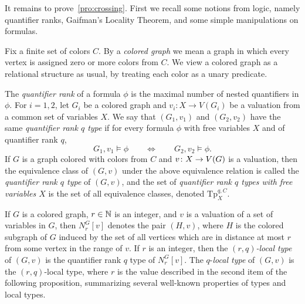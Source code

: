 It remains to prove~\cref{pro:crossing}. 
First we recall some notions from logic, namely quantifier ranks, Gaifman's Locality Theorem, and some simple manipulations on formulas.

 Fix a finite set of  colors $C$.
By a \emph{colored graph} we mean a graph  in which 
every vertex is assigned zero or more colors from $C$. We view a colored graph as a relational structure as usual, by treating each color as a unary predicate. 

The \emph{quantifier rank} of a formula $\phi$ is the maximal number of nested quantifiers in $\phi$.
For $i=1,2$, let $G_i$
be a colored graph and $v_i:X\to V(G_i)$ be a valuation
from a common set of variables $X$.
We say that $(G_1, v_1)$ and $(G_2,v_2)$
have the same \emph{quantifier rank $q$ type} %
if for every formula $\phi$ with  free variables $X$ and of quantifier rank $q$,
 $$G_1,v_1\models \phi\qquad\iff \qquad G_2,v_2\models \phi.$$
If $G$ is a graph colored with colors from $C$ and 
 $v\colon X\to V(G)$ is a valuation, 
then the equivalence class of $(G, v)$ under the above equivalence relation is called the \emph{quantifier rank $q$ type} of $(G,v)$, and  the set of \emph{quantifier rank $q$ types with  free variables $X$}
is the set of all equivalence classes, denoted
$\mathrm{Tp}^{q,C}_X$.

 If $G$ is a colored graph, $r\in\mathbb{N}$ is an integer, and $v$ is a valuation of a set of variables in $G$, then  $N^G_r[v]$ denotes the pair $(H,v)$, where $H$ is the colored subgraph of $G$
induced by the set of all vertices which are in distance at most $r$
from some vertex in the range of $v$.
If $r$ is an integer, then the \emph{$(r,q)$-local type} of $(G,v)$ is 
the quantifier rank $q$ type of $N^G_r[v]$. The $q$-\emph{local type} of $(G,v)$ is the $(r,q)$-local type, where $r$   is the value described in the second item of the following proposition,  summarizing several well-known properties of types and local types.


